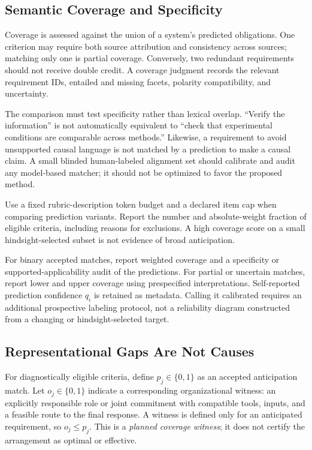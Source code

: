 \subsection{Semantic Coverage and Specificity}

Coverage is assessed against the union of a system's predicted obligations. One criterion may require both source attribution and consistency across sources; matching only one is partial coverage. Conversely, two redundant requirements should not receive double credit. A coverage judgment records the relevant requirement IDs, entailed and missing facets, polarity compatibility, and uncertainty.

The comparison must test specificity rather than lexical overlap. ``Verify the information'' is not automatically equivalent to ``check that experimental conditions are comparable across methods.'' Likewise, a requirement to avoid unsupported causal language is not matched by a prediction to make a causal claim. A small blinded human-labeled alignment set should calibrate and audit any model-based matcher; it should not be optimized to favor the proposed method.

Use a fixed rubric-description token budget and a declared item cap when comparing prediction variants. Report the number and absolute-weight fraction of eligible criteria, including reasons for exclusions. A high coverage score on a small hindsight-selected subset is not evidence of broad anticipation.

For binary accepted matches, report weighted coverage and a specificity or supported-applicability audit of the predictions. For partial or uncertain matches, report lower and upper coverage using prespecified interpretations. Self-reported prediction confidence $q_i$ is retained as metadata. Calling it calibrated requires an additional prospective labeling protocol, not a reliability diagram constructed from a changing or hindsight-selected target.

\subsection{Representational Gaps Are Not Causes}

For diagnostically eligible criteria, define $p_j\in\{0,1\}$ as an accepted anticipation match. Let $o_j\in\{0,1\}$ indicate a corresponding organizational witness: an explicitly responsible role or joint commitment with compatible tools, inputs, and a feasible route to the final response. A witness is defined only for an anticipated requirement, so $o_j\leq p_j$. This is a \emph{planned coverage witness}; it does not certify the arrangement as optimal or effective.

